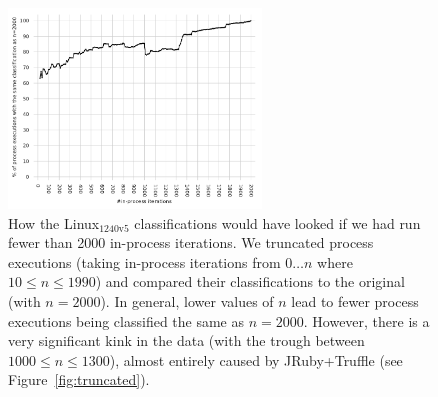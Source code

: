 \documentclass[acmsmall]{acmart}\settopmatter{printfolios=true}
\newcommand{\bencherseven}{Linux$_\mathrm{1240v5}$\xspace}
\begin{document}
\begin{figure}[!tbp]
\centering
\includegraphics[width=0.6\textwidth]{examples/truncated_same_plot.pdf}
\caption{How the \bencherseven classifications would have looked if we had run fewer than
2000 in-process iterations. We truncated process
executions (taking in-process iterations from $0 \ldots n$ where $10 \leq n \leq
1990$) and compared their classifications to the original (with $n=2000$).
In general, lower values of $n$ lead to fewer process executions
being classified the same as $n=2000$. However, there is a very significant kink in the
data (with the trough between $1000 \leq n \leq 1300$), almost entirely caused by JRuby+Truffle (see
Figure~\ref{fig:truncated}).}
\label{fig:sametruncated}
\end{figure}
\end{document}
